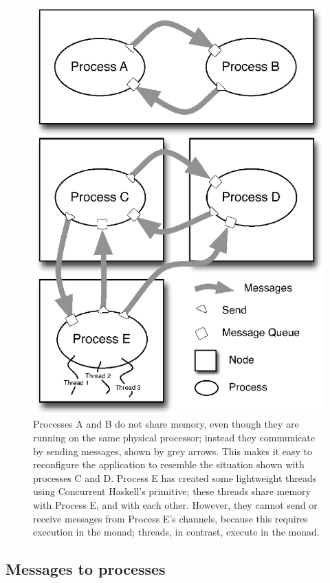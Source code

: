 \documentclass{sigplanconf}
\begin{document}
\begin{figure}[t]
\centerline {
 \includegraphics[width=0.9\columnwidth]{threadsAndProcesses.ps}
}
\caption{ 
\label{fig:ProcessBubbles}
Processes A and B do not share memory, even though they are running on the same physical processor; instead they communicate by sending messages, shown by grey arrows.  This makes it easy to reconfigure the application to resemble the situation shown with processes C and D.  Process E has created some lightweight threads using Concurrent Haskell's  primitive; these threads share memory with Process E, and with each other.  However, they cannot send or receive messages from Process E's channels, because this requires execution in the  monad; threads, in contrast, execute in the  monad.
}
\end{figure}


\subsection{Messages to processes}
\label{s:sendAndExpect}
\end{document}
